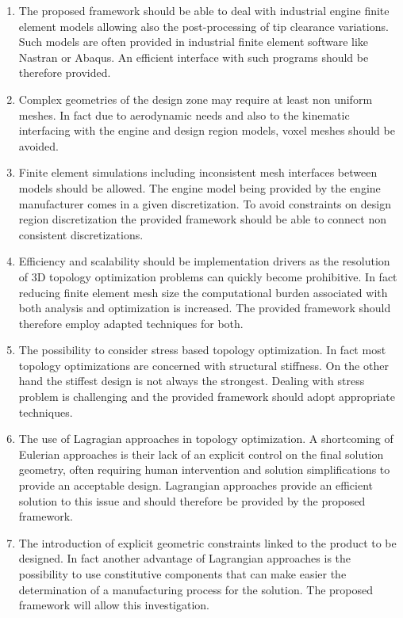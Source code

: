 \begin{enumerate}
\item The proposed framework should be able to deal with industrial engine finite element models allowing also the post-processing of tip clearance variations. Such models are often provided in industrial finite element software like Nastran or Abaqus. An efficient interface with such programs should be therefore provided.
\item Complex geometries of the design zone may require at least non uniform meshes. In fact due to aerodynamic needs and also to the kinematic interfacing with the engine and design region models, voxel meshes should be avoided.  
\item  Finite element simulations including inconsistent mesh interfaces between models should be allowed. The engine model being provided by the engine manufacturer comes in a given discretization. To avoid constraints on design region discretization the provided framework should be able to connect non consistent discretizations.
\item  Efficiency and scalability should be implementation drivers as the resolution of 3D topology optimization problems can quickly become prohibitive. In fact reducing finite element mesh size the computational burden associated with both analysis and optimization is increased. The provided framework should therefore employ adapted techniques for both.  
\item The possibility to consider stress based topology optimization. In fact most topology optimizations are concerned with  structural stiffness. On the other hand the stiffest design is not always the strongest. Dealing with stress problem is challenging and the provided framework should adopt appropriate techniques. 
\item The use of Lagragian approaches in topology optimization. A shortcoming of Eulerian approaches is their lack of an explicit control on the final solution geometry, often requiring human intervention and solution simplifications to provide an acceptable design. Lagrangian approaches provide an efficient solution to this issue and should therefore be provided by the proposed framework.
\item The introduction of explicit geometric constraints linked to the product to be designed. In fact another advantage of Lagrangian approaches is the possibility to use constitutive components that can make easier the determination of a manufacturing process for the solution. The proposed framework will allow this investigation.
\end{enumerate}
